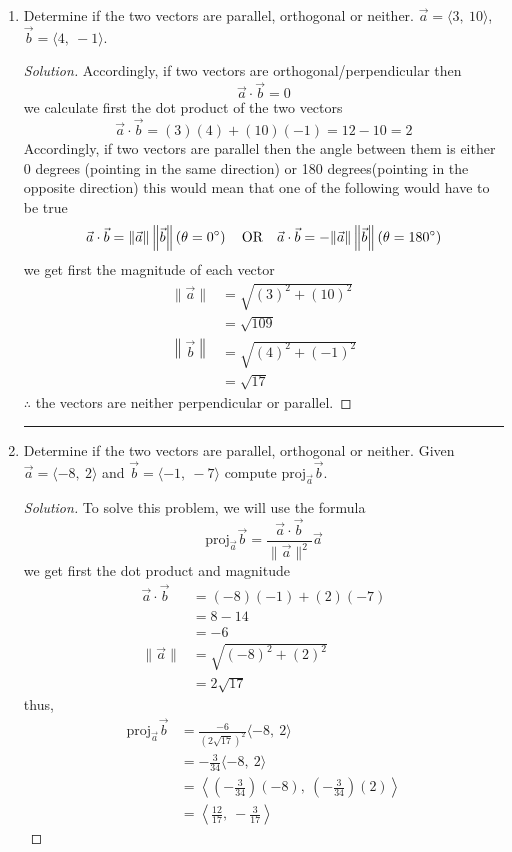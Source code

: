 \documentclass[12pt]{article}
\begin{document}
\begin{enumerate}
			\item[7.)] Determine if the two vectors are parallel, orthogonal or neither. \(\vec{a} = \langle 3,~10\rangle\), \(\vec{b} = \langle 4,~-1\rangle\).
				\begin{proof}[Solution]
					Accordingly, if two vectors are orthogonal/perpendicular then
					\[\vec{a}\cdot\vec{b} = 0\]
					we calculate first the dot product of the two vectors
					\[\vec{a}\cdot\vec{b} = \left(3\right)\left(4\right)+\left(10\right)\left(-1\right) = 12-10 = 2\]
					Accordingly,  if two vectors are parallel then the angle between them is either 0 degrees (pointing in the same direction) or 180 degrees(pointing in the opposite direction) this would mean that one of the following would have to be true
					\[\vec{a}\cdot\vec{b} = \|\vec{a}\|\left\|\vec{b}\right\|\left(\theta = 0\degree\right)\quad \text{OR} \quad \vec{a}\cdot\vec{b} = -\|\vec{a}\|\left\|\vec{b}\right\|\left(\theta = 180\degree \right)\]
					we get first the magnitude of each vector
					\begin{align*}
						\|\vec{a}\| & = \sqrt{\left(3\right)^2+\left(10\right)^2} \\
						& = \sqrt{109} \\
						\left\|\vec{b}\right\| & = \sqrt{\left(4\right)^2+\left(-1\right)^2} \\
						& = \sqrt{17}
					\end{align*}
					\(\therefore\) the vectors are neither perpendicular or parallel.
				\end{proof}
				\hrule
			
			\item[9.)] Determine if the two vectors are parallel, orthogonal or neither. Given \(\vec{a} = \langle -8,~2\rangle\) and \(\vec{b} = \langle -1,~-7 \rangle\) compute \(\displaystyle \text{proj}_{\vec{a}}\vec{b}\).
				\begin{proof}[Solution]
					To solve this problem, we will use the formula
					\[\text{proj}_{\vec{a}}\vec{b} = \frac{\vec{a}\cdot\vec{b}}{\|\vec{a}\|^2}\vec{a}\]
					we get first the dot product and magnitude
					\begin{align*}
						\vec{a}\cdot\vec{b} & = \left(-8\right)\left(-1\right)+\left(2\right)\left(-7\right) \\
						& = 8-14 \\
						& = -6 \\
						\|\vec{a}\| & = \sqrt{\left(-8\right)^2+\left(2\right)^2} \\
						& = 2\sqrt{17}
					\end{align*}
					thus,
					\begin{align*}
						\text{proj}_{\vec{a}}\vec{b} & = \frac{-6}{\left(2\sqrt{17}\right)^2}\langle -8,~2\rangle \\
						& = -\frac{3}{34}\langle -8,~2\rangle \\
						& = \left\langle \left(-\frac{3}{34}\right)\left(-8\right),~\left(-\frac{3}{34}\right)\left(2\right) \right\rangle \\
						& = \left\langle \frac{12}{17},~-\frac{3}{17}\right\rangle
					\end{align*}
				\end{proof}
		\end{enumerate}
	
\end{document}
